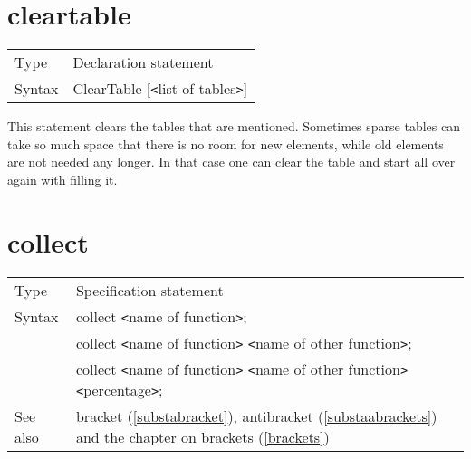 
\section{cleartable}
\label{substacleartable}

\noindent \begin{tabular}{ll}
Type & Declaration statement\\
Syntax & ClearTable [{\tt<}list of tables{\tt>}]
\end{tabular} \vspace{4mm}

\noindent This statement clears the tables that are mentioned. Sometimes 
sparse tables can take so much space that there is no room for new 
elements, while old elements are not needed any longer. In that case one 
can clear the table and start all over again with filling it.
\vspace{10mm}


\section{collect}
\label{substacollect}

\noindent \begin{tabular}{ll}
Type & Specification statement\\
Syntax & collect {\tt<}name of function{\tt>}; \\
       & collect {\tt<}name of function{\tt>} 
        {\tt<}name of other function{\tt>}; \\
       & collect {\tt<}name of function{\tt>} 
        {\tt<}name of other function{\tt>} {\tt<}percentage{\tt>};
\\ See also & bracket (\ref{substabracket}), antibracket 
     (\ref{substaabrackets}) and the chapter on brackets 
     (\ref{brackets})
\end{tabular} \vspace{4mm}

